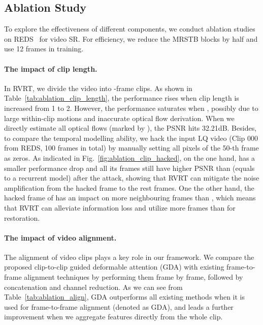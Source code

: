 \documentclass{article}
\newlength \g
\begin{document}
\subsection{Ablation Study}
To explore the effectiveness of different components, we conduct ablation studies on REDS~\cite{nah2019ntireREDS} for video SR. For efficiency, we reduce the MRSTB blocks by half and use 12 frames in training.

\vspace{-0.3cm}
\paragraph{The impact of clip length.}
In RVRT, we divide the video into -frame clips. As shown in Table~\ref{tab:ablation_clip_length}, the performance rises when clip length is increased from 1 to 2. However, the performance saturates when , possibly due to large within-clip motions and inaccurate optical flow derivation. When we directly estimate all optical flows (marked by ), the PSNR hits 32.21dB. Besides, to compare the temporal modelling ability, we hack the input LQ video (Clip 000 from REDS, 100 frames in total) by manually setting all pixels of the 50-th frame as zeros. As indicated in Fig.~\ref{fig:ablation_clip_hacked}, on the one hand,  has a smaller performance drop and all its frames still have higher PSNR than  (equals to a recurrent model) after the attack, showing that RVRT can mitigate the noise amplification from the hacked frame to the rest frames. One the other hand, the hacked frame of  has an impact on more neighbouring frames than , which means that RVRT can alleviate information loss and utilize more frames than  for restoration.


\vspace{-0.3cm}
\paragraph{The impact of video alignment.}
The alignment of video clips plays a key role in our framework. We compare the proposed clip-to-clip guided deformable attention (GDA) with existing frame-to-frame alignment techniques by performing them frame by frame, followed by concatenation and channel reduction. As we can see from Table~\ref{tab:ablation_align}, GDA outperforms all existing methods when it is used for frame-to-frame alignment (denoted as GDA), and leads a further improvement when we aggregate features directly from the whole clip.

\vspace{-0.3cm}
\end{document}
